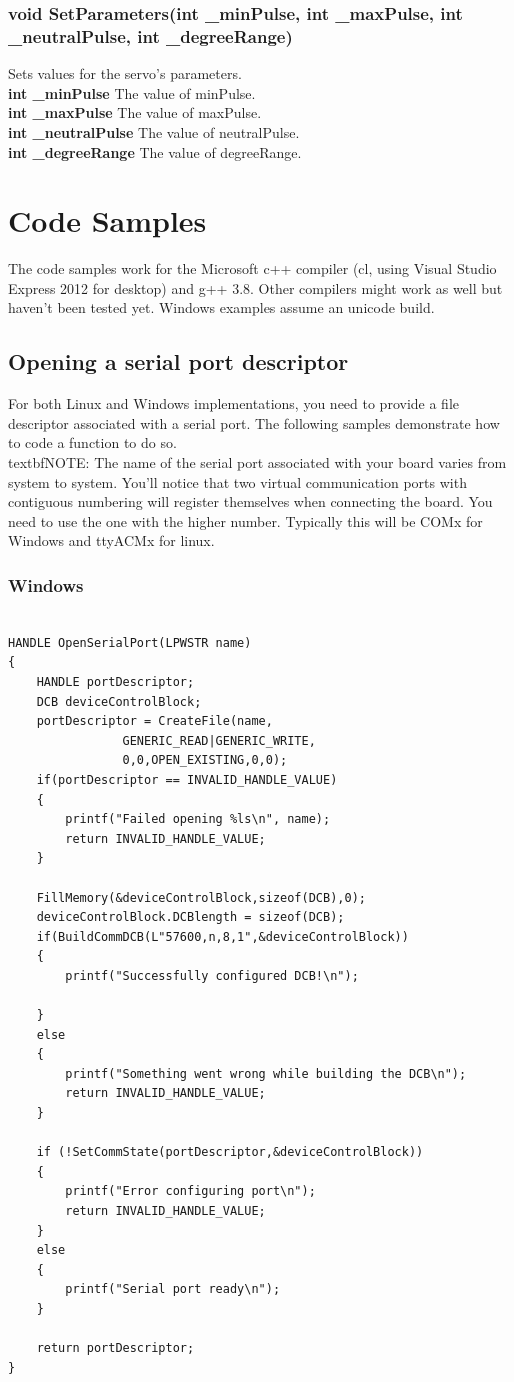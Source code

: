\documentclass[letterpaper]{book}
\begin{document}
\subsection{void SetParameters(int \_minPulse, int \_maxPulse, int \_neutralPulse, int \_degreeRange)}
Sets values for the servo's parameters.\\
\textbf{int \_minPulse} The value of minPulse.\\
\textbf{int \_maxPulse} The value of maxPulse.\\
\textbf{int \_neutralPulse} The value of neutralPulse.\\
\textbf{int \_degreeRange} The value of degreeRange.

\chapter{Code Samples}
The code samples work for the Microsoft c++ compiler (cl, using Visual Studio Express 2012 for desktop) and g++ 3.8. Other compilers might work as well but haven't been tested yet. Windows examples assume an unicode build. \\
\section{Opening a serial port descriptor}
For both Linux and Windows implementations, you need to provide a file descriptor associated with a serial port. The following samples demonstrate how to code a function to do so.\\
textbf{NOTE: }The name of the serial port associated with your board varies from system to system. You'll notice that two virtual communication ports with contiguous numbering will register themselves when connecting the board. You need to use the one with the higher number. Typically this will be COMx for Windows and ttyACMx for linux.\\
\subsection{Windows}
\begin{lstlisting}

HANDLE OpenSerialPort(LPWSTR name)
{
	HANDLE portDescriptor;
	DCB deviceControlBlock;
	portDescriptor = CreateFile(name,
				GENERIC_READ|GENERIC_WRITE,
				0,0,OPEN_EXISTING,0,0);
	if(portDescriptor == INVALID_HANDLE_VALUE)
	{
		printf("Failed opening %ls\n", name);
		return INVALID_HANDLE_VALUE;
	}

	FillMemory(&deviceControlBlock,sizeof(DCB),0);
	deviceControlBlock.DCBlength = sizeof(DCB);
	if(BuildCommDCB(L"57600,n,8,1",&deviceControlBlock))
	{
		printf("Successfully configured DCB!\n");
		
	}
	else
	{
		printf("Something went wrong while building the DCB\n");
		return INVALID_HANDLE_VALUE;
	}

	if (!SetCommState(portDescriptor,&deviceControlBlock))
	{
		printf("Error configuring port\n");
		return INVALID_HANDLE_VALUE;
	}
	else
	{
		printf("Serial port ready\n");
	}
		
	return portDescriptor;
}

\end{lstlisting}
\end{document}
